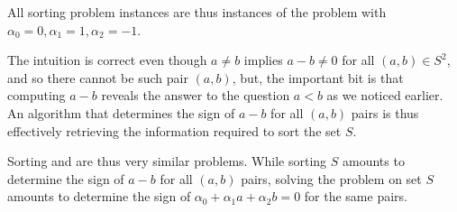 All sorting problem instances are thus instances of the \twoLDT problem with
$\alpha_0 = 0, \alpha_1 = 1, \alpha_2 = -1$.

The intuition is correct even though $a \neq b$ implies $a-b \neq 0$ for all
$(a,b) \in S^2$, and so there cannot be such pair $(a,b)$, but, the important
bit is that computing $a-b$ reveals the answer to the question $a<b$ as we
noticed earlier. An algorithm that determines the sign of $a-b$ for all $(a,b)$
pairs is thus effectively retrieving the information required to sort the set
$S$.

Sorting and \twoLDT are thus very similar problems. While sorting $S$ amounts
to determine the sign of $a-b$ for all $(a,b)$ pairs, solving the \twoLDT
problem on set $S$ amounts to determine the sign of $\alpha_0 + \alpha_1 a +
\alpha_2 b = 0$ for the same pairs.
